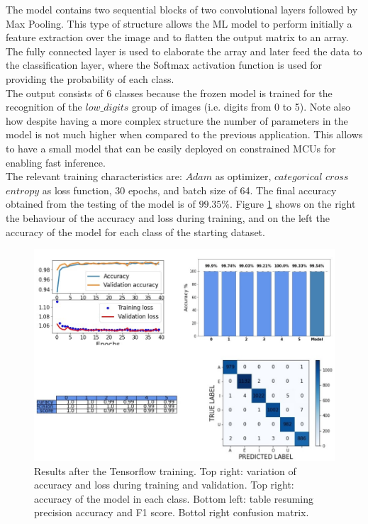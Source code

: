 \documentclass[12pt]{report}
\begin{document}
The model contains two sequential blocks of two convolutional layers followed by Max Pooling. This type of structure allows the ML model to perform initially a feature extraction over the image and to flatten the output matrix to an array. The fully connected layer is used to elaborate the array and later feed the data to the classification layer, where the Softmax activation function is used for providing the probability of each class.\\
The output consists of 6 classes because the frozen model is trained for the recognition of the $low\_ digits$ group of images (i.e. digits from 0 to 5). Note also how despite having a more complex structure the number of parameters in the model is not much higher when compared to the previous application. This allows to have a small model that can be easily deployed on constrained MCUs for enabling fast inference. \\
The relevant training characteristics are: $Adam$ as optimizer, $categorical$ $cross$ $entropy$ as loss function, 30 epochs, and batch size of 64. The final accuracy obtained from the testing of the model is of $99.35\%$. Figure \ref{fig:training_mnist} shows on the right the behaviour of the accuracy and loss during training, and on the left the accuracy of the model for each class of the starting dataset.

\begin{figure}[h!]
    \centering
    \includegraphics[width=130mm]{Figures/Chapter4/training_digits.jpg} 
    \caption{Results after the Tensorflow training. Top right: variation of accuracy and loss during training and validation. Top right: accuracy of the model in each class. Bottom left: table resuming precision accuracy and F1 score. Bottol right confusion matrix.}
    \label{fig:training_mnist}    
\end{figure}
\end{document}
